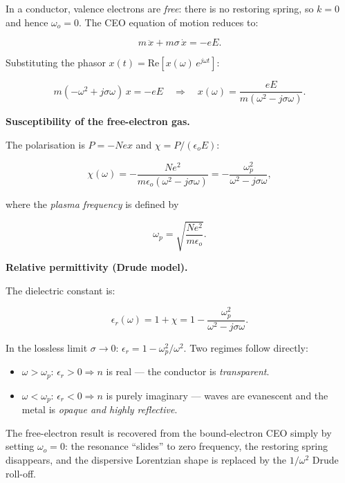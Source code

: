 In a conductor, valence electrons are \emph{free}: there is no restoring spring, so $k = 0$ and hence $\omega_o = 0$. The CEO equation of motion reduces to:

\begin{equation*}
  m\,\ddot{x} + m\sigma\,\dot{x} = -eE.
\end{equation*}

Substituting the phasor $x(t) = \mathrm{Re}[x(\omega)\,e^{j\omega t}]$:

\begin{equation*}
  m(-\omega^2 + j\sigma\omega)\,x = -eE
  \quad\Longrightarrow\quad
  x(\omega) = \frac{eE}{m(\omega^2 - j\sigma\omega)}.
\end{equation*}

\textbf{Susceptibility of the free-electron gas.}

The polarisation is $P = -Nex$ and $\chi = P/(\epsilon_o E)$:

\begin{equation*}
  \chi(\omega) = -\frac{Ne^2}{m\epsilon_o(\omega^2 - j\sigma\omega)}
  = -\frac{\omega_p^2}{\omega^2 - j\sigma\omega},
\end{equation*}

where the \emph{plasma frequency} is defined by

\begin{equation*}
  \boxed{\omega_p = \sqrt{\frac{Ne^2}{m\epsilon_o}}.}
\end{equation*}

\textbf{Relative permittivity (Drude model).}

The dielectric constant is:

\begin{equation*}
  \boxed{\epsilon_r(\omega) = 1 + \chi = 1 - \frac{\omega_p^2}{\omega^2 - j\sigma\omega}.}
\end{equation*}

In the lossless limit $\sigma \to 0$: $\epsilon_r = 1 - \omega_p^2/\omega^2$. Two regimes follow directly:

\begin{itemize}
  \item $\omega > \omega_p$: $\epsilon_r > 0 \Rightarrow n$ is real --- the conductor is \emph{transparent}.
  \item $\omega < \omega_p$: $\epsilon_r < 0 \Rightarrow n$ is purely imaginary --- waves are evanescent and the metal is \emph{opaque and highly reflective}.
\end{itemize}

The free-electron result is recovered from the bound-electron CEO simply by setting $\omega_o = 0$: the resonance ``slides'' to zero frequency, the restoring spring disappears, and the dispersive Lorentzian shape is replaced by the $1/\omega^2$ Drude roll-off.
